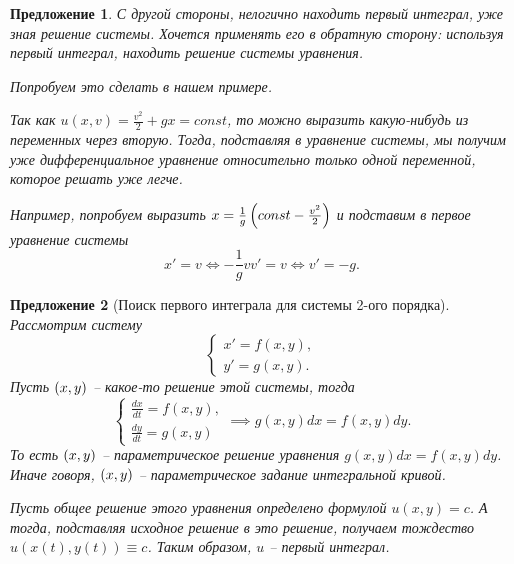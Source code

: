 \documentclass[a5paper, 11pt]{article}
\theoremstyle{definition}
\theoremstyle{plain}
\newtheorem*{Prop}{Предложение}
\theoremstyle{remark}
\begin{document}
	\begin{Prop}
		С другой стороны, нелогично находить первый интеграл, уже зная решение системы. Хочется применять его в обратную сторону: используя первый интеграл, находить решение системы уравнения.
		
		Попробуем это сделать в нашем примере.
		
		Так как $u(x,v) = \frac{v^2}{2} + gx = const$, то можно выразить какую-нибудь из переменных через вторую. Тогда, подставляя в уравнение системы, мы получим уже дифференциальное уравнение относительно только одной переменной, которое решать уже легче.
		
		Например, попробуем выразить $x = \frac1g \left(const-\frac{v^2}{2}\right)$ и подставим в первое уравнение системы
		\[
		x' = v \Leftrightarrow -\frac1g v v' = v \Leftrightarrow v' = -g.
		\] 
	\end{Prop}

	\begin{Prop}[Поиск первого интеграла для системы 2-ого порядка]
		Рассмотрим систему
		\[
		\begin{cases}
			x' = f(x,y),\\
			y' = g(x,y).
		\end{cases}
		\]
		Пусть $\left(x,y\right)$ -- какое-то решение этой системы, тогда
		\[
		\begin{cases}
			\frac{dx}{dt} = f(x,y),\\
			\frac{dy}{dt} = g(x,y)
		\end{cases}
		\implies g(x,y) dx = f(x,y) dy.
		\]
		То есть $\left(x,y\right)$ -- параметрическое решение уравнения $g(x,y) dx = f(x,y) dy$. Иначе говоря,  $\left(x,y\right)$ --  параметрическое задание интегральной кривой.
		
		Пусть общее решение этого уравнения определено формулой $u(x,y)=c$. А тогда, подставляя исходное решение в это решение, получаем тождество $u(x(t),y(t)) \equiv c$. Таким образом, $u$ -- первый интеграл. 	
	\end{Prop}
\end{document}
